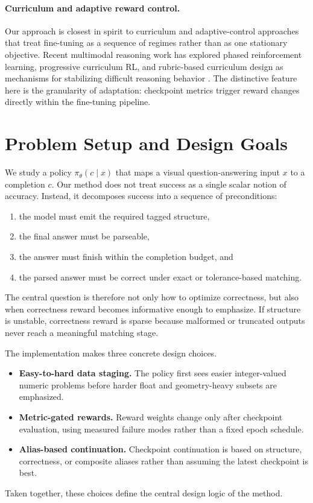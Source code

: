 \documentclass{article} %
\begin{document}
\paragraph{Curriculum and adaptive reward control.}
Our approach is closest in spirit to curriculum and adaptive-control approaches that treat fine-tuning as a sequence of regimes rather than as one stationary objective. Recent multimodal reasoning work has explored phased reinforcement learning, progressive curriculum RL, and rubric-based curriculum design as mechanisms for stabilizing difficult reasoning behavior \citep{liu2025infimmr,yuan2025vlcogito,chen2026rucl}. The distinctive feature here is the granularity of adaptation: checkpoint metrics trigger reward changes directly within the fine-tuning pipeline.

\section{Problem Setup and Design Goals}

We study a policy $\pi_\theta(c \mid x)$ that maps a visual question-answering input $x$ to a completion $c$. Our method does not treat success as a single scalar notion of accuracy. Instead, it decomposes success into a sequence of preconditions:
\begin{enumerate}[leftmargin=1.2em]
\item the model must emit the required tagged structure,
\item the final answer must be parseable,
\item the answer must finish within the completion budget, and
\item the parsed answer must be correct under exact or tolerance-based matching.
\end{enumerate}
The central question is therefore not only how to optimize correctness, but also when correctness reward becomes informative enough to emphasize. If structure is unstable, correctness reward is sparse because malformed or truncated outputs never reach a meaningful matching stage.

The implementation makes three concrete design choices.
\begin{itemize}[leftmargin=1.2em]
\item \textbf{Easy-to-hard data staging.} The policy first sees easier integer-valued numeric problems before harder float and geometry-heavy subsets are emphasized.
\item \textbf{Metric-gated rewards.} Reward weights change only after checkpoint evaluation, using measured failure modes rather than a fixed epoch schedule.
\item \textbf{Alias-based continuation.} Checkpoint continuation is based on structure, correctness, or composite aliases rather than assuming the latest checkpoint is best.
\end{itemize}
Taken together, these choices define the central design logic of the method.
\end{document}
